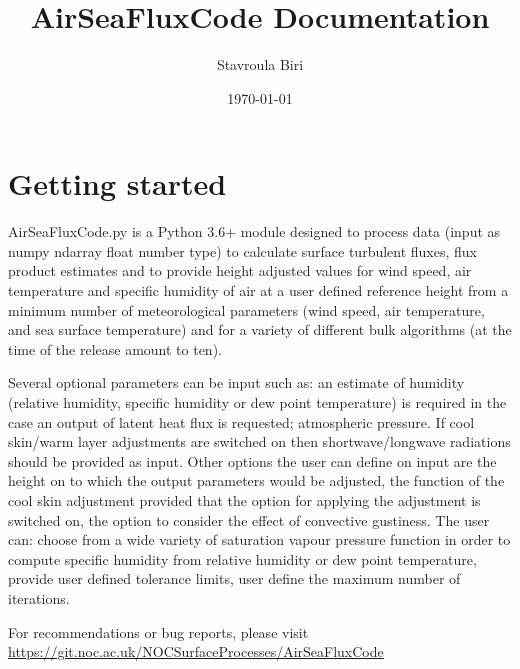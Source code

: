\documentclass[letterpaper,10pt,english]{sphinxmanual}
\title{AirSeaFluxCode Documentation}
\date{\today}
\author{Stavroula Biri}
\begin{document}
\maketitle
\sphinxtableofcontents
{}\label{\detokenize{index::doc}}
 


\chapter{Getting started}
\label{\detokenize{index:flux-code-documentation}}\label{\detokenize{index:getting-started}}
AirSeaFluxCode.py is a Python 3.6+ module designed to process data (input as numpy ndarray float number type) to calculate surface turbulent fluxes, flux product estimates and to provide height adjusted values for wind speed, air temperature and specific humidity of air at a user defined reference height from a minimum number of meteorological parameters (wind speed, air temperature, and sea surface temperature) and for a variety of different bulk algorithms (at the time of the release amount to ten). 

Several optional parameters can be input such as: an estimate of humidity (relative humidity, specific humidity or dew point temperature) is required in the case an output of latent heat flux is requested; atmospheric pressure. If cool skin/warm layer adjustments are switched on then shortwave/longwave radiations should be provided as input. Other options the user can define on input are the height on to which the output parameters would be adjusted, the function of the cool skin adjustment provided that the option for applying the adjustment is switched on, the option to consider the effect of convective gustiness. The user can: choose from a wide variety of saturation vapour pressure function in order to compute specific humidity from relative humidity or dew point temperature, provide user defined tolerance limits, user define the maximum number of iterations.

%
For recommendations or bug reports, please visit \url{https://git.noc.ac.uk/NOCSurfaceProcesses/AirSeaFluxCode}
\end{document}
